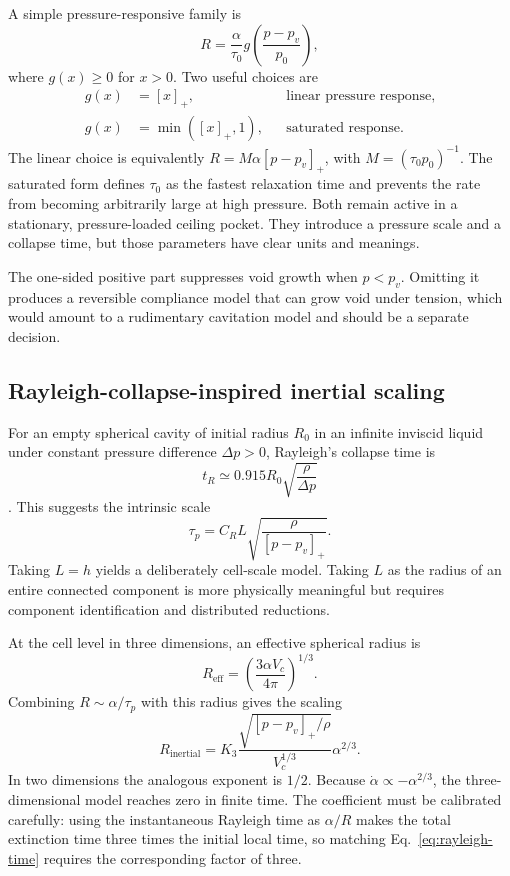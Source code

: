\documentclass[11pt]{article}
\newcommand{\pos}[1]{\left[#1\right]_+}
\begin{document}
A simple pressure-responsive family is
\begin{equation}
  R=\frac{\alpha}{\tau_0}
  g\!\left(\frac{p-p_v}{p_0}\right),
  \label{eq:pressure-relaxation}
\end{equation}
where \(g(x)\ge0\) for \(x>0\).  Two useful choices are
\begin{align}
  g(x)&=\pos{x}, &&\text{linear pressure response},\\
  g(x)&=\min(\pos{x},1), &&\text{saturated response}.
\end{align}
The linear choice is equivalently \(R=M\alpha\pos{p-p_v}\), with
\(M=(\tau_0p_0)^{-1}\).  The saturated form defines \(\tau_0\) as the fastest relaxation
time and prevents the rate from becoming arbitrarily large at high pressure.  Both remain
active in a stationary, pressure-loaded ceiling pocket.  They introduce a pressure scale
and a collapse time, but those parameters have clear units and meanings.

The one-sided positive part suppresses void growth when \(p<p_v\).  Omitting it produces
a reversible compliance model that can grow void under tension, which would amount to a
rudimentary cavitation model and should be a separate decision.

\subsection{Rayleigh-collapse-inspired inertial scaling}

For an empty spherical cavity of initial radius \(R_0\) in an infinite inviscid liquid
under constant pressure difference \(\Delta p>0\), Rayleigh's collapse time is
\begin{equation}
  t_R\simeq0.915R_0\sqrt{\frac{\rho}{\Delta p}}
  \label{eq:rayleigh-time}
\end{equation}
\cite{rayleigh1917,brennen1995}.  This suggests the intrinsic scale
\begin{equation}
  \tau_p=C_R L\sqrt{\frac{\rho}{\pos{p-p_v}}}.
  \label{eq:pressure-time}
\end{equation}
Taking \(L=h\) yields a deliberately cell-scale model.  Taking \(L\) as the radius of an
entire connected component is more physically meaningful but requires component
identification and distributed reductions.

At the cell level in three dimensions, an effective spherical radius is
\begin{equation}
  R_{\mathrm{eff}}=
  \left(\frac{3\alpha V_c}{4\pi}\right)^{1/3}.
\end{equation}
Combining \(R\sim\alpha/\tau_p\) with this radius gives the scaling
\begin{equation}
  R_{\mathrm{inertial}}=
  K_3\frac{\sqrt{\pos{p-p_v}/\rho}}{V_c^{1/3}}\alpha^{2/3}.
  \label{eq:inertial-rate}
\end{equation}
In two dimensions the analogous exponent is \(1/2\).  Because
\(\dot\alpha\propto-\alpha^{2/3}\), the three-dimensional model reaches zero in finite
time.  The coefficient must be calibrated carefully: using the instantaneous Rayleigh
time as \(\alpha/R\) makes the total extinction time three times the initial local time,
so matching Eq.~\eqref{eq:rayleigh-time} requires the corresponding factor of three.
\end{document}
